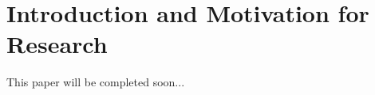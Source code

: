 \documentclass{llncs}
\begin{document}
\renewcommand{\thesubfigure}{\thefigure.\arabic{subfigure}}
\makeatletter
\renewcommand{\p@subfigure}{}
\renewcommand{\@thesubfigure}{\thesubfigure:\hskip\subfiglabelskip}
\makeatother


\section{Introduction and Motivation for Research}

This paper will be completed soon...


%
%
\end{document}
